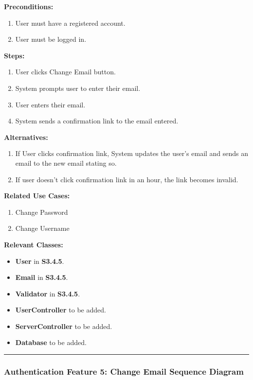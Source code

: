 \documentclass[twoside,letterpaper]{article}
\begin{document}
\noindent\textbf{Preconditions:}
\begin{enumerate}
	\item User must have a registered account.
	\item User must be logged in.
\end{enumerate}

\noindent\textbf{Steps:}
\begin{enumerate}
	\item User clicks Change Email button.
	\item System prompts user to enter their email.
	\item User enters their email.
	\item System sends a confirmation link to the email entered.
\end{enumerate}

\noindent\textbf{Alternatives:}
\begin{enumerate}
	\item If User clicks confirmation link, System updates the user's email and sends an email to the new email stating so.
	\item If user doesn't click confirmation link in an hour, the link becomes invalid.
\end{enumerate}

\noindent\textbf{Related Use Cases:}
\begin{enumerate}
	\item Change Password
	\item Change Username
\end{enumerate}

\noindent\textbf{Relevant Classes:}
\begin{itemize}
	\item \textbf{User} in \textbf{S3.4.5}.
	\item \textbf{Email} in \textbf{S3.4.5}.
	\item \textbf{Validator} in \textbf{S3.4.5}.
	\item \textbf{UserController} to be added.
	\item \textbf{ServerController} to be added.
	\item \textbf{Database} to be added.
\end{itemize}
\vspace{8pt}
\hrule
\newpage

\subsubsection[Authentication Feature 5: Change Email Sequence Diagram]{\rmfamily\bfseries\color{black}
	Authentication Feature 5: Change Email Sequence Diagram}
\hypertarget{RefHeading22059017292}{}
\label{a:sd5}
\bigskip
\end{document}
